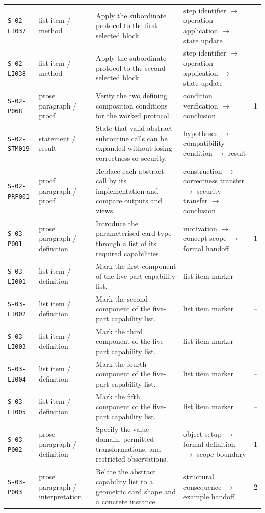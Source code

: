 \documentclass[10pt]{article}
\begin{document}
\begin{longtable}{@{}p{}p{}p{}p{}p{}@{}}
\texttt{S-02-LI037}&list item / method&Apply the subordinate protocol to the first selected block.&step identifier $\rightarrow$ operation application $\rightarrow$ state update&--\\
\texttt{S-02-LI038}&list item / method&Apply the subordinate protocol to the second selected block.&step identifier $\rightarrow$ operation application $\rightarrow$ state update&--\\
\texttt{S-02-P068}&prose paragraph / proof&Verify the two defining composition conditions for the worked protocol.&condition verification $\rightarrow$ conclusion&1\\
\texttt{S-02-STM019}&statement / result&State that valid abstract subroutine calls can be expanded without losing correctness or security.&hypotheses $\rightarrow$ compatibility condition $\rightarrow$ result&--\\
\texttt{S-02-PRF001}&proof paragraph / proof&Replace each abstract call by its implementation and compare outputs and views.&construction $\rightarrow$ correctness transfer $\rightarrow$ security transfer $\rightarrow$ conclusion&--\\
\texttt{S-03-P001}&prose paragraph / definition&Introduce the parameterised card type through a list of its required capabilities.&motivation $\rightarrow$ concept scope $\rightarrow$ formal handoff&1\\
\texttt{S-03-LI001}&list item / definition&Mark the first component of the five-part capability list.&list item marker&--\\
\texttt{S-03-LI002}&list item / definition&Mark the second component of the five-part capability list.&list item marker&--\\
\texttt{S-03-LI003}&list item / definition&Mark the third component of the five-part capability list.&list item marker&--\\
\texttt{S-03-LI004}&list item / definition&Mark the fourth component of the five-part capability list.&list item marker&--\\
\texttt{S-03-LI005}&list item / definition&Mark the fifth component of the five-part capability list.&list item marker&--\\
\texttt{S-03-P002}&prose paragraph / definition&Specify the value domain, permitted transformations, and restricted observations.&object setup $\rightarrow$ formal definition $\rightarrow$ scope boundary&1\\
\texttt{S-03-P003}&prose paragraph / interpretation&Relate the abstract capability list to a geometric card shape and a concrete instance.&structural consequence $\rightarrow$ example handoff&2\\

\end{longtable}
\end{document}
